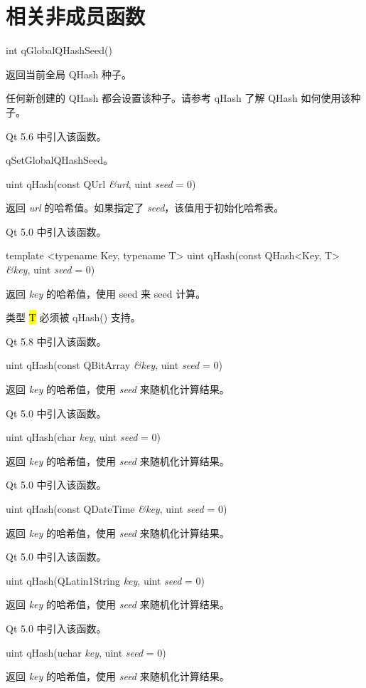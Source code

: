 \section{相关非成员函数}

int qGlobalQHashSeed()

返回当前全局 QHash 种子。

任何新创建的 QHash 都会设置该种子。请参考 qHash 了解 QHash 如何使用该种子。

Qt 5.6 中引入该函数。


\begin{notice}[另请参阅]
qSetGlobalQHashSeed。
\end{notice}


uint qHash(const QUrl \emph{\&url}, uint \emph{seed} = 0)

返回 \emph{url} 的哈希值。如果指定了 \emph{seed}，该值用于初始化哈希表。

Qt 5.0 中引入该函数。

template <typename Key, typename T> uint qHash(const QHash<Key, T> \emph{\&key}, uint \emph{seed} = 0)

返回 \emph{key} 的哈希值，使用 seed 来 seed 计算。

类型 \hl{T} 必须被 qHash() 支持。

Qt 5.8 中引入该函数。

uint qHash(const QBitArray \emph{\&key}, uint \emph{seed} = 0)

返回 \emph{key} 的哈希值，使用 \emph{seed} 来随机化计算结果。

Qt 5.0 中引入该函数。

uint qHash(char \emph{key}, uint \emph{seed} = 0)

返回 \emph{key} 的哈希值，使用 \emph{seed} 来随机化计算结果。

Qt 5.0 中引入该函数。

uint qHash(const QDateTime \emph{\&key}, uint \emph{seed} = 0)

返回 \emph{key} 的哈希值，使用 \emph{seed} 来随机化计算结果。

Qt 5.0 中引入该函数。

uint qHash(QLatin1String \emph{key}, uint \emph{seed} = 0)

返回 \emph{key} 的哈希值，使用 \emph{seed} 来随机化计算结果。

Qt 5.0 中引入该函数。

uint qHash(uchar \emph{key}, uint \emph{seed} = 0)

返回 \emph{key} 的哈希值，使用 \emph{seed} 来随机化计算结果。

